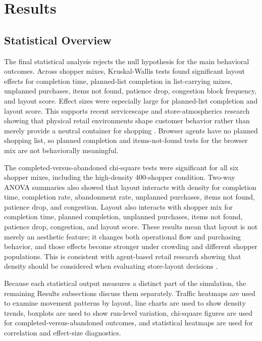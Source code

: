 \documentclass[sigconf,nonacm]{acmart}
\begin{document}
\section{Results}

\subsection{Statistical Overview}

The final statistical analysis rejects the null hypothesis for the main behavioral outcomes. Across shopper mixes, Kruskal-Wallis tests found significant layout effects for completion time, planned-list completion in list-carrying mixes, unplanned purchases, items not found, patience drop, congestion block frequency, and layout score. Effect sizes were especially large for planned-list completion and layout score. This supports recent servicescape and store-atmospherics research showing that physical retail environments shape customer behavior rather than merely provide a neutral container for shopping \citep{mari2013,spence2014}. Browser agents have no planned shopping list, so planned completion and items-not-found tests for the browser mix are not behaviorally meaningful.

The completed-versus-abandoned chi-square tests were significant for all six shopper mixes, including the high-density 400-shopper condition. Two-way ANOVA summaries also showed that layout interacts with density for completion time, completion rate, abandonment rate, unplanned purchases, items not found, patience drop, and congestion. Layout also interacts with shopper mix for completion time, planned completion, unplanned purchases, items not found, patience drop, congestion, and layout score. These results mean that layout is not merely an aesthetic feature; it changes both operational flow and purchasing behavior, and those effects become stronger under crowding and different shopper populations. This is consistent with agent-based retail research showing that density should be considered when evaluating store-layout decisions \citep{pantano2021}.

Because each statistical output measures a distinct part of the simulation, the remaining Results subsections discuss them separately. Traffic heatmaps are used to examine movement patterns by layout, line charts are used to show density trends, boxplots are used to show run-level variation, chi-square figures are used for completed-versus-abandoned outcomes, and statistical heatmaps are used for correlation and effect-size diagnostics.
\end{document}
